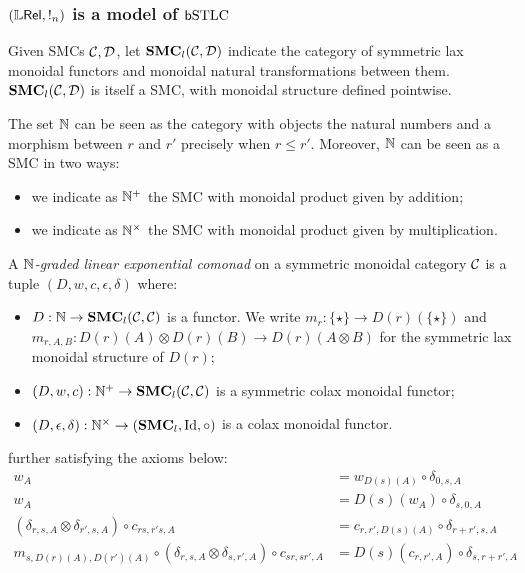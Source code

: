 \subsubsection{$(\mathbb{L} \mathsf{Rel}, !_{n})$ is a model of $\mathsf b\mathrm{STLC}$}

Given SMCs $\mathcal{C},\mathcal{D}$,  let $\mathbf{SMC}_{l}(\mathcal{C}, \mathcal{D})$ indicate the category of symmetric lax monoidal functors and monoidal natural transformations between them.
$\mathbf{SMC}_{l}(\mathcal{C}, \mathcal{D})$  is itself a SMC, with monoidal structure defined pointwise.

The set 
$\mathbb{N}$ can be seen as the category with objects the natural numbers and a morphism between $r$ and $r'$ precisely when $r\leq r'$. 
Moreover, $\mathbb{N}$ can be seen as a SMC in two ways:
\begin{itemize}

\item we indicate as $\mathbb{N}^{+}$ the SMC with monoidal product given by addition;
\item we indicate as $\mathbb{N}^{\times}$ the SMC with monoidal product given by multiplication.
\end{itemize}



\begin{definition}
A \emph{$\mathbb{N}$-graded linear exponential comonad} on a symmetric monoidal category $\mathcal{C}$ is a tuple
$(D, w,c,\epsilon,\delta)$ where:
\begin{itemize}

\item $D: \mathbb{N}\to \mathbf{SMC}_{l}(\mathcal{C}, \mathcal{C})$ is a functor. We write 
$m_{r}:\{\star\} \to D(r)(\{\star\})$ and $m_{r,A,B}: D(r)(A)\otimes D(r)(B) \to D(r)(A\otimes B)$ for the symmetric lax monoidal structure of $D(r)$;

\item $(D,w,c): \mathbb{N}^{+}\to \mathbf{SMC}_{l}(\mathcal{C}, \mathcal{C})$ is a symmetric colax monoidal functor;

\item $(D,\epsilon,\delta):\mathbb{N}^{\times}\to (\mathbf{SMC}_{l},\mathrm{Id},\circ) $ is a colax monoidal functor.



\end{itemize}
further satisfying the axioms below:
\begin{align}
w_{A}& =  w_{D(s)(A)}\circ \delta_{0,s,A}\\
w_{A} & = D(s)(w_{A} )\circ \delta_{s,0,A} \\
(\delta_{r,s,A}\otimes \delta_{r',s,A})\circ c_{rs,r's,A}
&=
c_{r,r',D(s)(A)}\circ \delta_{r+r',s,A}\\
m_{s,D(r)(A),D(r')(A)}\circ (\delta_{r,s,A}\otimes \delta_{s,r',A})\circ c_{sr,sr',A}&=
D(s)(c_{r,r',A})\circ \delta_{s,r+r',A}
\end{align}
\end{definition}


